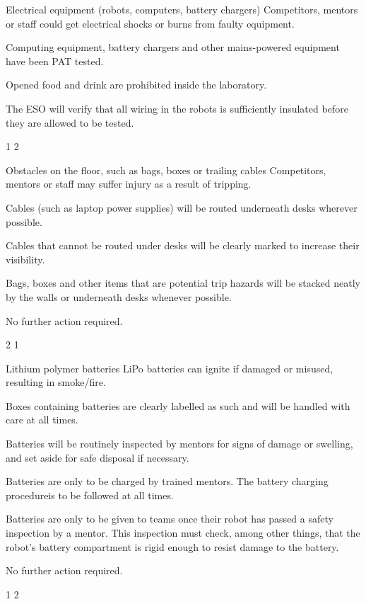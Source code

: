 {    \risk
        {Electrical equipment (robots, computers, battery chargers)}
        {Competitors, mentors or staff could get electrical shocks or burns from faulty
         equipment.}
        {\item Computing equipment, battery chargers and other mains-powered
         equipment have been PAT tested.
         \item Opened food and drink are prohibited inside the laboratory.}
        {\item The ESO will verify that all wiring in the robots is sufficiently
         insulated before they are allowed to be tested.}
        {1} %
        {2} %

    \risk
        {Obstacles on the floor, such as bags, boxes or trailing cables}
        {Competitors, mentors or staff may suffer injury as a result of tripping.}
        {\item Cables (such as laptop power supplies) will be routed underneath
         desks wherever possible.
         \item Cables that cannot be routed under desks will be clearly marked
         to increase their visibility.
         \item Bags, boxes and other items that are potential trip hazards will
         be stacked neatly by the walls or underneath desks whenever possible.}
        {\item No further action required.}
        {2} %
        {1} %

    \risk
        {Lithium polymer batteries}
        {LiPo batteries can ignite if damaged or misused, resulting in
         smoke/fire.}
        {\item Boxes containing batteries are clearly labelled as such and will
         be handled with care at all times.
         \item Batteries will be routinely inspected by mentors for signs of
         damage or swelling, and set aside for safe disposal if necessary.
         \item Batteries are only to be charged by trained mentors. The battery
         charging procedure\chargingfootnote is to be followed at all times.
         \item Batteries are only to be given to teams once their robot has
         passed a safety inspection by a mentor. This inspection must check,
         among other things, that the robot's battery compartment is rigid
         enough to resist damage to the battery.}
        {\item No further action required.}
        {1} %
        {2} %
}



